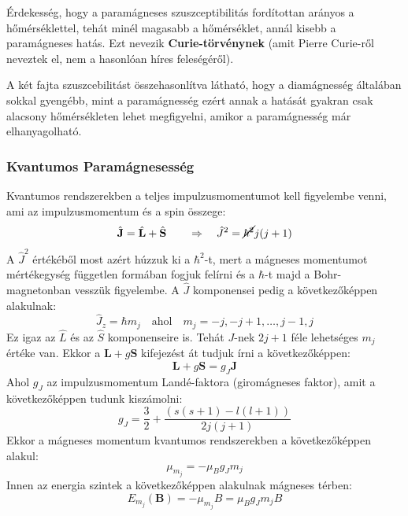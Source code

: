 \documentclass[../main.tex]{subfiles}
\begin{document}
Érdekesség, hogy a paramágneses szuszceptibilitás fordítottan arányos a hőmérséklettel, tehát minél magasabb a hőmérséklet, annál kisebb a paramágneses hatás. Ezt nevezik \textbf{Curie-törvénynek} 
(amit Pierre Curie-ről neveztek el, nem a hasonlóan híres feleségéről).

A két fajta szuszcebilitást összehasonlítva látható, hogy a diamágnesség általában sokkal gyengébb, mint a paramágnesség ezért annak a hatását gyakran csak alacsony hőmérsékleten lehet megfigyelni, amikor a paramágnesség már elhanyagolható.

\subsubsection{Kvantumos Paramágnesesség}
Kvantumos rendszerekben a teljes impulzusmomentumot kell figyelembe venni, ami az impulzusmomentum és a spin összege:
\begin{equation}
    \hat{\mathbf{J}} = \hat{\mathbf{L}} + \hat{\mathbf{S}} \qquad \Rightarrow \quad \hat{J}^2 = \cancel{\hbar^2} j(j+1)
\end{equation}
A $\hat{J}^2$ értékéből most azért húzzuk ki a $\hbar^2$-t, mert a mágneses momentumot mértékegység független formában fogjuk felírni és a $\hbar$-t majd a Bohr-magnetonban vesszük figyelembe.
A $\hat{J}$ komponensei pedig a következőképpen alakulnak:
\begin{equation}
    \hat{J}_z = \hbar m_j \quad \text{ahol} \quad m_j = -j, -j+1, \ldots, j-1, j
\end{equation}
Ez igaz az $\hat{L}$ és az $\hat{S}$ komponenseire is. Tehát $J$-nek $2j+1$ féle lehetséges $m_j$ értéke van. Ekkor a $\mathbf{L} + g \mathbf{S}$ kifejezést át tudjuk írni a következőképpen:
\begin{equation}
    \mathbf{L} + g \mathbf{S} = g_J \mathbf{J}
\end{equation}
Ahol $g_J$ az impulzusmomentum Landé-faktora (giromágneses faktor), amit a következőképpen tudunk kiszámolni:
\begin{equation}
    g_J = \frac{3}{2} + \frac{(s(s+1) - l(l+1))}{2j(j+1)}
\end{equation}
Ekkor a mágneses momentum kvantumos rendszerekben a következőképpen alakul:
\begin{equation}
    \mu_{m_j} = - \mu_B g_J m_j
\end{equation}
Innen az energia szintek a következőképpen alakulnak mágneses térben:
\begin{equation}
    E_{m_j}(\mathbf{B}) = - \mu_{m_j} B = \mu_B g_J m_j B
\end{equation}
\end{document}
